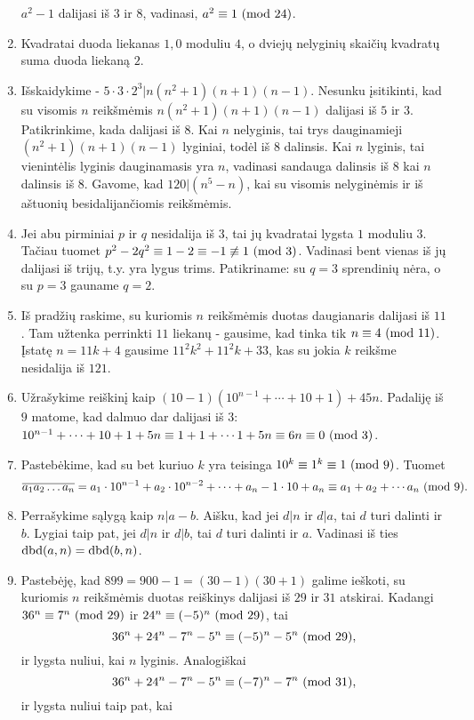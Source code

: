 \begin{enumerate}
$a^2-1$ dalijasi iš $3$ ir $8$, vadinasi, $a^2 \equiv 1 \ (\text{mod } 24)$.
\item 
Kvadratai duoda liekanas $1,0$ moduliu $4$, o dviejų nelyginių skaičių
kvadratų suma duoda liekaną $2$.
\item 
Išskaidykime - $5\cdot3\cdot2^3 | n(n^2+1)(n+1)(n-1)$. Nesunku
įsitikinti, kad su visomis $n$ reikšmėmis $n(n^2+1)(n+1)(n-1)$
dalijasi iš $5$ ir $3$. Patikrinkime, kada dalijasi iš $8$. Kai
$n$ nelyginis, tai trys dauginamieji $(n^2+1)(n+1)(n-1)$ lyginiai,
todėl iš $8$ dalinsis. Kai $n$ lyginis, tai vienintėlis lyginis
dauginamasis yra $n$, vadinasi sandauga dalinsis iš $8$ kai $n$
dalinsis iš $8$. Gavome, kad $120|(n^5-n)$, kai su visomis nelyginėmis
ir iš aštuonių besidalijančiomis reikšmėmis.
\item 
Jei abu pirminiai $p$ ir $q$ nesidalija iš $3$, tai jų kvadratai
lygsta $1$ moduliu $3$. Tačiau tuomet $p^2 - 2q^2 \equiv 1-2 \equiv -1
\not \equiv 1\ (\text{mod } 3)$. Vadinasi bent vienas iš jų dalijasi iš trijų,
t.y. yra lygus trims. Patikriname: su $q=3$ sprendinių nėra, o su  
$p=3$ gauname $q=2$.
\item 
Iš pradžių raskime, su kuriomis $n$ reikšmėmis duotas daugianaris
dalijasi iš $11$. Tam užtenka perrinkti $11$ liekanų - gausime, kad
tinka tik $n\equiv 4 \ (\text{mod } 11)$. Įstatę $n = 11k + 4$ gausime $11^2 k^2 +
11^2k + 33$, kas su jokia $k$ reikšme nesidalija iš $121$.
\item 
Užrašykime reiškinį kaip $(10 - 1)(10^{n-1} + \cdots + 10 + 1) + 45n$.
Padaliję iš $9$ matome, kad dalmuo dar dalijasi iš $3$:
$10^{n-1} + \cdots + 10 + 1 + 5n \equiv 1 + 1 + \cdots 1 + 5n \equiv
6n \equiv 0 \ (\text{mod } 3)$.
\item 
Pastebėkime, kad su bet kuriuo $k$ yra teisinga $10^k \equiv 1^k
\equiv 1\ (\text{mod } 9)$. Tuomet $$\overline{a_1a_2\dots a_n}=a_1\cdot 10^{n-1}
+ a_2\cdot 10^{n-2} + \cdots + a_n-1\cdot 10 + a_n \equiv a_1 + a_2 +
\cdots a_n \ (\text{mod } 9).$$ 
\item 
Perrašykime sąlygą kaip $n|a-b$. Aišku, kad jei $d|n$ ir $d|a$, tai
$d$ turi dalinti ir $b$. Lygiai taip pat, jei $d|n$ ir $d|b$, tai $d$
turi dalinti ir $a$. Vadinasi iš ties $\operatorname{dbd}(a,n) = \operatorname{dbd}(b,n)$.
\item 
Pastebėję, kad $899 = 900 - 1 = (30-1)(30+1)$ galime ieškoti, su
kuriomis $n$ reikšmėmis duotas reiškinys dalijasi iš $29$ ir $31$
atskirai.  Kadangi $36^n \equiv 7^n \ (\text{mod } 29)$ ir $24^n \equiv
(-5)^n\ (\text{mod } 29)$, tai $$36^n + 24^n - 7^n -5^n\equiv (-5)^n -5^n
\ (\text{mod } 29),$$ ir lygsta nuliui, kai $n$ lyginis. Analogiškai $$36^n + 24^n
- 7^n -5^n\equiv (-7)^n - 7^n \ (\text{mod } 31),$$ ir lygsta nuliui taip pat, kai

\end{enumerate}
